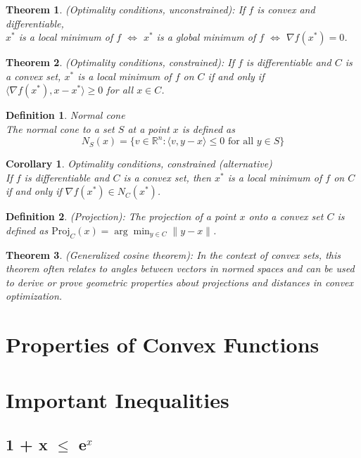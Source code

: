 \documentclass[11pt]{book} %
\newtheorem{theorem}{Theorem}[section]
\newtheorem{definition}{Definition}[section]
\newtheorem{corollary}{Corollary}[section]
\begin{document}
\begin{theorem} (Optimality conditions, unconstrained): If $f$ is convex and differentiable, \\
     $x^*$ is a local minimum of $f$ $\Leftrightarrow$ $x^*$ is a global minimum of $f$ $\Leftrightarrow$  $\nabla f(x^*) = 0$.
\end{theorem}

\begin{theorem} (Optimality conditions, constrained): If $f$ is differentiable and $C$ is a convex set,
     $x^*$ is a local minimum of $f$ on $C$ if and only if $\langle \nabla f(x^*), x - x^* \rangle \geq 0$ for all $x \in C$.
\end{theorem}

\begin{definition}{Normal cone} \\
The normal cone to a set $S$ at a point $x$ is defined as
\begin{equation}
    N_S(x) = \{ v \in \mathbb{R}^n : \langle v, y-x \rangle \leq 0 \text{ for all } y \in S \}
\end{equation}
\end{definition}

\begin{corollary}{Optimality conditions, constrained (alternative)} \\
If $f$ is differentiable and $C$ is a convex set, then $x^*$ is a local minimum of $f$ on $C$ if and only if $\nabla f(x^*) \in N_C(x^*)$.
\end{corollary}

\begin{definition} (Projection): The projection of a point $x$ onto a convex set $C$ is defined as $\text{Proj}_C(x) = \arg\min_{y \in C} \|y-x\|$.
\end{definition}

\begin{theorem} (Generalized cosine theorem): In the context of convex sets, this theorem often relates to angles between vectors in normed spaces and can be used to derive or prove geometric properties about projections and distances in convex optimization.
\end{theorem}


\section{Properties of Convex Functions}


\section{Important Inequalities}

\subsection{1 + x $\leq$ e$^{x}$}
\end{document}
